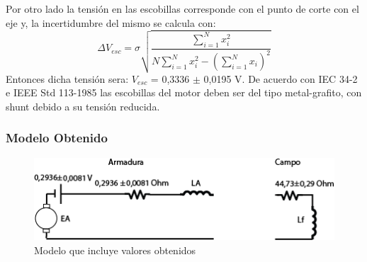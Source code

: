 \documentclass[11pt,letterpaper]{article}     %
\begin{document}
Por otro lado la tensión en las escobillas corresponde con el punto de corte con el eje y, la incertidumbre del mismo se calcula con:
\begin{equation}
	\Delta V_{esc} = \sigma \sqrt{\frac{\sum_{i=1}^{N}x_{i}^{2}}{N\sum_{i=1}^{N}x_{i}^{2}-\left(\sum_{i=1}^{N}x_{i}\right)^{2}}}
\end{equation}
Entonces dicha tensión sera: $V_{esc}$ = 0,3336 $\pm$ 0,0195 V. De acuerdo con IEC 34-2 e IEEE Std 113-1985 las escobillas del motor deben ser del tipo metal-grafito, con shunt debido a su tensión reducida. 
\subsubsection{Modelo Obtenido}
\begin{figure}[H]
	\centering
	\includegraphics[scale=0.9]{./recursos-Lab6/diagModeloObtenido.png}
	\caption{Modelo que incluye valores obtenidos}
	\label{fig:modObtenido}
\end{figure}
\end{document}
